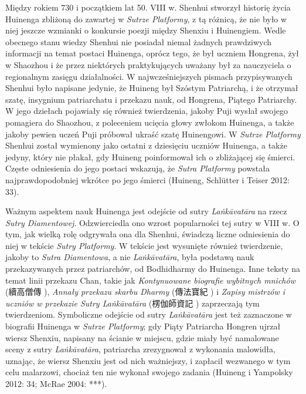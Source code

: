 Między rokiem 730 i początkiem lat 50. VIII w. Shenhui stworzył historię życia Huinenga zbliżoną do zawartej w \textit{Sutrze Platformy}, z tą różnicą, że nie było w niej jeszcze wzmianki o konkursie poezji między Shenxiu i Huinengiem. Wedle obecnego stanu wiedzy Shenhui nie posiadał niemal żadnych prawdziwych informacji na temat postaci Huinenga, oprócz tego, że był uczniem Hongrena, żył w Shaozhou i że przez niektórych praktykujących uważany był za nauczyciela o regionalnym zasięgu działalności. W najwcześniejszych pismach przypisywanych Shenhui było napisane jedynie, że Huineng był Szóstym Patriarchą, i że otrzymał szatę, insygnium patriarchatu i przekazu nauk, od Hongrena, Piątego Patriarchy. W jego dziełach pojawiały się również twierdzenia, jakoby Puji wysłał swojego pomagiera do Shaozhou, z poleceniem ucięcia głowy zwłokom Huinenga, a także jakoby pewien uczeń Puji próbował ukraść szatę Huinengowi. W \textit{Sutrze Platformy} Shenhui został wymienony jako ostatni z dziesięciu uczniów Huinenga, a także jedyny, który nie płakał, gdy Huineng poinformował ich o zbliżającej się śmierci. Częste odniesienia do jego postaci wskazują, że \textit{Sutra Platformy} powstała najprawdopodobniej wkrótce po jego śmierci (Huineng, Schlütter i Teiser 2012: 33).

Ważnym aspektem nauk Huinenga jest odejście od sutry \textit{Laṅkāvatāra} na rzecz \textit{Sutry Diamentowej}. Odzwierciedla ono wzrost popularności tej sutry w VIII w. O tym, jak wielką rolę odgrywała ona dla Shenhui, świadczą liczne odniesienia do niej w tekście \textit{Sutry Platformy}. W tekście jest wysunięte również twierdzenie, jakoby to \textit{Sutra Diamentowa}, a nie \textit{Laṅkāvatāra}, była podstawą nauk przekazywanych przez patriarchów, od Bodhidharmy do Huinenga. Inne teksty na temat linii przekazu Chan, takie jak \textit{Kontynuowane biografie wybitnych mnichów} (續高僧傳 ), \textit{Annały przekazu skarbu Dharmy} (傳法寶紀 ) i \textit{Zapisy mistrzów i uczniów w przekazie Sutry Laṅkāvatāra} (楞伽師資記 ) zaprzeczają tym twierdzeniom. Symboliczne odejście od sutry \textit{Laṅkāvatāra} jest też zaznaczone w biografii Huinenga w \textit{Sutrze Platformy}; gdy Piąty Patriarcha Hongren ujrzał wiersz Shenxiu, napisany na ścianie w miejscu, gdzie miały być namalowane sceny z sutry \textit{Laṅkāvatāra}, patriarcha zrezygnował z wykonania malowidła, uznając, że wiersz Shenxiu jest od nich ważniejszy, i zapłacił wezwanego w tym celu malarzowi, chociaż ten nie wykonał swojego zadania (Huineng i Yampolsky 2012: 34; McRae 2004: ***).

